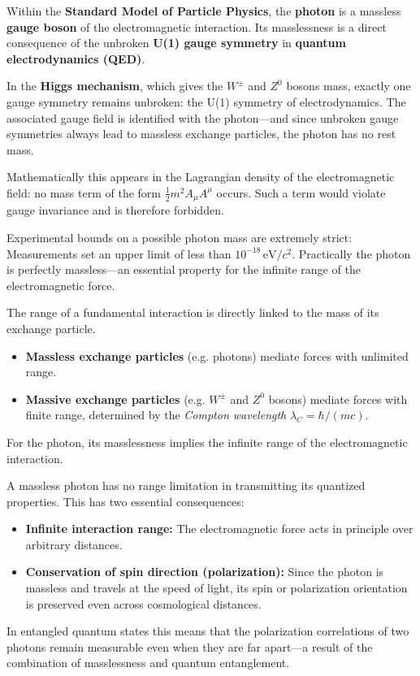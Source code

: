 Within the \textbf{Standard Model of Particle Physics}, the \textbf{photon} is a massless \textbf{gauge boson} of the electromagnetic interaction.  
Its masslessness is a direct consequence of the unbroken \textbf{U(1) gauge symmetry} in \textbf{quantum electrodynamics (QED)}.

In the \textbf{Higgs mechanism}, which gives the \(W^\pm\) and \(Z^0\) bosons mass, exactly one gauge symmetry remains unbroken: the U(1) symmetry of electrodynamics.  
The associated gauge field is identified with the photon—and since unbroken gauge symmetries always lead to massless exchange particles, the photon has no rest mass.

Mathematically this appears in the Lagrangian density of the electromagnetic field: no mass term of the form \(\frac{1}{2} m^2 A_\mu A^\mu\) occurs.  
Such a term would violate gauge invariance and is therefore forbidden.

Experimental bounds on a possible photon mass are extremely strict:  
Measurements set an upper limit of less than \(10^{-18}\,\mathrm{eV}/c^2\).  
Practically the photon is perfectly massless—an essential property for the infinite range of the electromagnetic force.

\vspace{1em}
\begin{tcolorbox}[hinweisbox, title=Masslessness and range]
	\label{box:reichweite_masselos}
	\small
	The range of a fundamental interaction is directly linked to the mass of its exchange particle.  
	\begin{itemize}
		\item \textbf{Massless exchange particles} (e.g. photons) mediate forces with unlimited range.  
		\item \textbf{Massive exchange particles} (e.g. \(W^\pm\) and \(Z^0\) bosons) mediate forces with finite range, determined by the \emph{Compton wavelength} \(\lambda_C = \hbar/(mc)\).
	\end{itemize}
	For the photon, its masslessness implies the infinite range of the electromagnetic interaction.
\end{tcolorbox}
\newpage
\noindent
\vspace{1em}
\begin{tcolorbox}[physikbox, title=Massless photon and spin correlations over long distances]
	\label{box:photon_spin_reichweite}
	\small
	A massless photon has no range limitation in transmitting its quantized properties.  
	This has two essential consequences:
	\begin{itemize}
		\item \textbf{Infinite interaction range:} The electromagnetic force acts in principle over arbitrary distances.
		\item \textbf{Conservation of spin direction (polarization):} Since the photon is massless and travels at the speed of light, its spin or polarization orientation is preserved even across cosmological distances. 
	\end{itemize}
	In entangled quantum states this means that the polarization correlations of two photons remain measurable even when they are far apart—a result of the combination of masslessness and quantum entanglement.
\end{tcolorbox}

